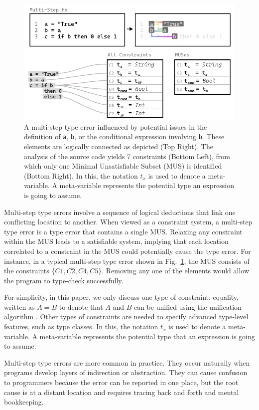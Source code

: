 \documentclass[pdflatex,lineno,sn-nature,Numbered]{sn-jnl}%
\begin{document}
\begin{figure}[hbt]
  \centering \includegraphics[width=0.8\linewidth]{images/Multi-Step-MUS}
  \caption {A multi-step type error influenced by potential issues in the definition of \texttt{a}, \texttt{b}, or the conditional expression involving \texttt{b}. These elements are logically connected as depicted (Top Right). The analysis of the source code yields 7 constraints (Bottom Left), from which only one Minimal Unsatisfiable Subset (MUS) is identified (Bottom Right). In this, the notation $t_x$ is used to denote a meta-variable. A meta-variable represents the potential type an expression is going to assume.
  }
  \label{fig:multi-step-2}
  \end{figure}

  Multi-step type errors involve a sequence of logical deductions that link one conflicting location to another. When viewed as a constraint system, a multi-step type error is a type error that contains a single MUS. Relaxing any constraint within the MUS leads to a satisfiable system, implying that each location correlated to a constraint in the MUS could potentially cause the type error. For instance, in a typical multi-step type error shown in  Fig.~\ref{fig:multi-step-2}, the MUS consists of the constraints $\{C1, C2, C4, C5\}$. Removing any one of the elements would allow the program to type-check successfully.

  For simplicity, in this paper, we only discuss one type of constraint: equality, written as $A = B$ to denote that $A$ and $B$ can be unified using the unification algorithm \cite{Robinson2012-hy}. Other types of constraints are needed to specify advanced type-level features, such as type classes. In this, the notation $t_x$ is used to denote a meta-variable. A meta-variable represents the potential type that an expression is going to assume. 

Multi-step type errors are more common in practice. They occur naturally when programs develop layers of indirection or abstraction. They can cause confusion to programmers because the error can be reported in one place, but the root cause is at a distant location and requires tracing back and forth and mental bookkeeping. 
\end{document}
